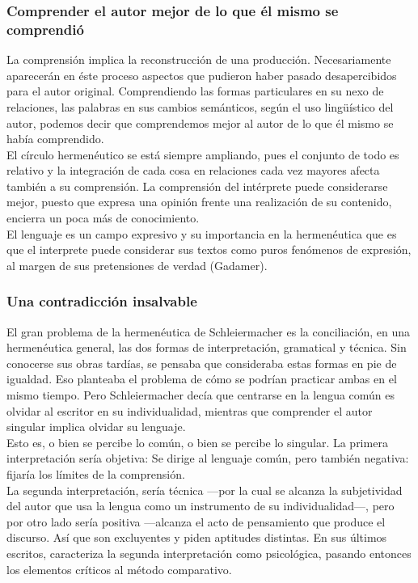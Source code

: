 \documentclass[a4paper, 11pt, twocolumn, spanish]{article}
\begin{document}
\subsubsection{Comprender el autor mejor de lo que él mismo se comprendió}
\label{sec:orgbe937fd}
La comprensión implica la reconstrucción de una
producción. Necesariamente aparecerán en éste proceso aspectos que
pudieron haber pasado desapercibidos para el autor
original. Comprendiendo las formas particulares en su nexo de
relaciones, las palabras en sus cambios semánticos, según el uso
lingüístico del autor, podemos decir que comprendemos mejor al autor
de lo que él mismo se había comprendido.\\[0pt]

El círculo hermenéutico se está siempre ampliando, pues el conjunto de
todo es relativo y la integración de cada cosa en relaciones cada vez
mayores afecta también a su comprensión. La comprensión del intérprete
puede considerarse mejor, puesto que expresa una opinión frente una
realización de su contenido, encierra un poca más de conocimiento.\\[0pt]
El lenguaje es un campo expresivo y su importancia en la hermenéutica
que es que el interprete puede considerar sus textos como puros
fenómenos de expresión, al margen de sus pretensiones de verdad
(Gadamer).

\subsubsection{Una contradicción insalvable}
\label{sec:orgb62ca5a}
El gran problema de la hermenéutica de Schleiermacher es la
conciliación, en una hermenéutica general, las dos formas de
interpretación, gramatical y técnica. Sin conocerse sus obras tardías,
se pensaba que consideraba estas formas en pie de igualdad. Eso
planteaba el problema de cómo se podrían practicar ambas en el mismo
tiempo. Pero Schleiermacher decía que centrarse en la lengua común es
olvidar al escritor en su individualidad, mientras que comprender el
autor singular implica olvidar su lenguaje.\\[0pt]

Esto es, o bien se percibe lo común, o bien se percibe lo singular. La
primera interpretación sería objetiva: Se dirige al lenguaje común,
pero también negativa: fijaría los límites de la comprensión.\\[0pt]
La segunda interpretación, sería técnica —por la cual se alcanza la
subjetividad del autor que usa la lengua como un instrumento de su
individualidad—, pero por otro lado sería positiva —alcanza el acto
de pensamiento que produce el discurso. Así que son excluyentes y
piden aptitudes distintas. En sus últimos escritos, caracteriza la
segunda interpretación como psicológica, pasando entonces los
elementos críticos al método comparativo.
\end{document}
